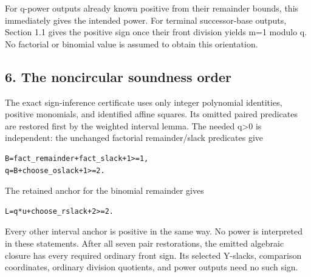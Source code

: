 For q-power outputs already known positive from their remainder bounds, this immediately gives the intended power. For terminal successor-base outputs, Section 1.1 gives the positive sign once their front division yields m=\allowbreak{}1 modulo q. No factorial or binomial value is assumed to obtain this orientation.



\subsection*{6. The noncircular soundness order}



The exact sign-inference certificate uses only integer polynomial identities, positive monomials, and identified affine squares. Its omitted paired predicates are restored first by the weighted interval lemma. The needed q\textgreater{}\allowbreak{}0 is independent: the unchanged factorial remainder/\allowbreak{}slack predicates give



\begin{verbatim}
B=fact_remainder+fact_slack+1>=1,
q=B+choose_oslack+1>=2.
\end{verbatim}

The retained anchor for the binomial remainder gives



\begin{verbatim}
L=q*u+choose_rslack+2>=2.
\end{verbatim}

Every other interval anchor is positive in the same way. No power is interpreted in these statements. After all seven pair restorations, the emitted algebraic closure has every required ordinary front sign. Its selected Y-slacks, comparison coordinates, ordinary division quotients, and power outputs need no such sign.



